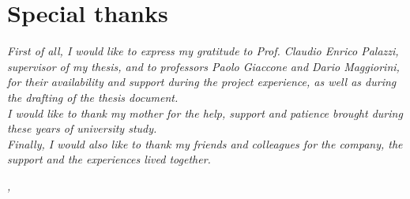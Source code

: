 
\cleardoublepage
{}
{}

\bigskip

\begingroup
\let\clearpage\relax
\let\cleardoublepage\relax
\let\cleardoublepage\relax

\chapter*{Special thanks}

\noindent \textit{First of all, I would like to express my gratitude to Prof. Claudio Enrico Palazzi, supervisor of my thesis, and to professors Paolo Giaccone and Dario Maggiorini, for their availability and support during the project experience, as well as during the drafting of the thesis document.}\\

\noindent \textit{I would like to thank my mother for the help, support and patience brought during these years of university study.}\\

\noindent \textit{Finally, I would also like to thank my friends and colleagues for the company, the support and the experiences lived together.}\\
\bigskip

\noindent\textit{\myLocation, \myTime}
\hfill \myName

\endgroup


